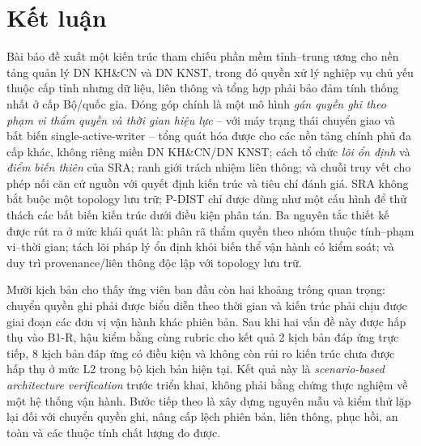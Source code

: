 \section{Kết luận}
\label{sec:conclusion}

Bài báo đề xuất một kiến trúc tham chiếu phần mềm tỉnh--trung ương cho nền tảng quản lý DN KH\&CN và DN KNST, trong đó quyền xử lý nghiệp vụ chủ yếu thuộc cấp tỉnh nhưng dữ liệu, liên thông và tổng hợp phải bảo đảm tính thống nhất ở cấp Bộ/quốc gia. Đóng góp chính là một mô hình \emph{gán quyền ghi theo phạm vi thẩm quyền và thời gian hiệu lực} -- với máy trạng thái chuyển giao và bất biến single-active-writer -- tổng quát hóa được cho các nền tảng chính phủ đa cấp khác, không riêng miền DN KH\&CN/DN KNST; cách tổ chức \emph{lõi ổn định} và \emph{điểm biến thiên} của SRA; ranh giới trách nhiệm liên thông; và chuỗi truy vết cho phép nối căn cứ nguồn với quyết định kiến trúc và tiêu chí đánh giá. SRA không bắt buộc một topology lưu trữ; P-DIST chỉ được dùng như một cấu hình để thử thách các bất biến kiến trúc dưới điều kiện phân tán. Ba nguyên tắc thiết kế được rút ra ở mức khái quát là: phân rã thẩm quyền theo nhóm thuộc tính--phạm vi--thời gian; tách lõi pháp lý ổn định khỏi biến thể vận hành có kiểm soát; và duy trì provenance/liên thông độc lập với topology lưu trữ.

Mười kịch bản cho thấy ứng viên ban đầu còn hai khoảng trống quan trọng: chuyển quyền ghi phải được biểu diễn theo thời gian và kiến trúc phải chịu được giai đoạn các đơn vị vận hành khác phiên bản. Sau khi hai vấn đề này được hấp thụ vào B1-R, hậu kiểm bằng cùng rubric cho kết quả 2 kịch bản đáp ứng trực tiếp, 8 kịch bản đáp ứng có điều kiện và không còn rủi ro kiến trúc chưa được hấp thụ ở mức L2 trong bộ kịch bản hiện tại. Kết quả này là \emph{scenario-based architecture verification} trước triển khai, không phải bằng chứng thực nghiệm về một hệ thống vận hành. Bước tiếp theo là xây dựng nguyên mẫu và kiểm thử lặp lại đối với chuyển quyền ghi, nâng cấp lệch phiên bản, liên thông, phục hồi, an toàn và các thuộc tính chất lượng đo được.
